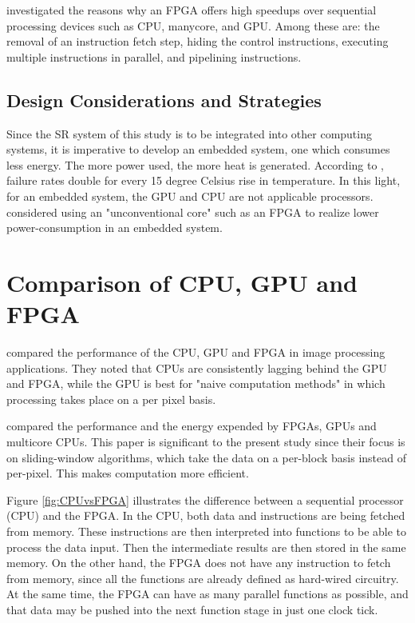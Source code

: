 \cite{Sirowy2008} investigated the reasons why an FPGA offers high speedups over sequential processing devices such as CPU, manycore, and GPU. 
Among these are: the removal of an instruction fetch step, hiding the control instructions, executing multiple instructions in parallel, and pipelining instructions.


\subsection{Design Considerations and Strategies}
Since the SR system of this study is to be integrated into other computing systems, it is imperative to develop an embedded system, one which consumes less energy.
The more power used, the more heat is generated. According to \cite{Anderson2003}, failure rates double for every 15 degree Celsius rise in temperature.
In this light, for an embedded system, the GPU and CPU are not applicable processors.
\cite{Mittal2014} considered using an "unconventional core" such as an FPGA to realize lower power-consumption in an embedded system.
\cite{Struyf2014}

\section{Comparison of CPU, GPU and FPGA}

\cite{Asano2009} compared the performance of the CPU, GPU and FPGA in image processing applications. 
They noted that CPUs are consistently lagging behind the GPU and FPGA, while the GPU is best for "naive computation methods" in which processing takes place on a per pixel basis.

\cite{Fowers2012} compared the performance and the energy expended by FPGAs, GPUs and multicore CPUs. 
This paper is significant to the present study since their focus is on sliding-window algorithms, which take the data on a per-block basis instead of per-pixel. This makes computation more efficient.

Figure \ref{fig:CPUvsFPGA} illustrates the difference between a sequential processor (CPU) and the FPGA. 
In the CPU, both data and instructions are being fetched from memory. 
These instructions are then interpreted into functions to be able to process the data input.
Then the intermediate results are then stored in the same memory.
On the other hand, the FPGA does not have any instruction to fetch from memory, since all the functions are already defined as hard-wired circuitry. 
At the same time, the FPGA can have as many parallel functions as possible, and that data may be pushed into the next function stage in just one clock tick.

